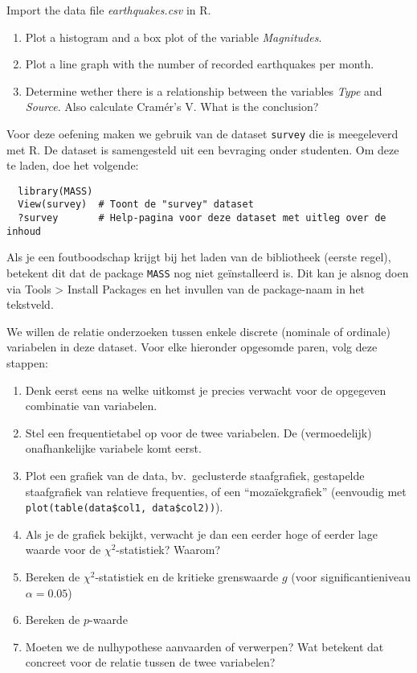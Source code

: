 \begin{exercise}
  \label{ex:earthquakes} %
  Import the data file \emph{earthquakes.csv} in R.

  \begin{enumerate}
    \item Plot a histogram and a box plot of the variable \emph{Magnitudes}.
    \item Plot a line graph with the number of recorded earthquakes per month.
    \item Determine wether there is a relationship between the variables \emph{Type} and \emph{Source}. Also calculate Cramér's V. What is the conclusion?
  \end{enumerate}
\end{exercise}

\begin{exercise}  %
  \label{ex:chisq-survey}
  Voor deze oefening maken we gebruik van de dataset \texttt{survey} die is meegeleverd met R. De dataset is samengesteld uit een bevraging onder studenten. Om deze te laden, doe het volgende:
  
  \begin{lstlisting}
  library(MASS)
  View(survey)  # Toont de "survey" dataset
  ?survey       # Help-pagina voor deze dataset met uitleg over de inhoud
  \end{lstlisting}
  
  Als je een foutboodschap krijgt bij het laden van de bibliotheek (eerste regel), betekent dit dat de package \texttt{MASS} nog niet geïnstalleerd is. Dit kan je alsnog doen via Tools > Install Packages en het invullen van de package-naam in het tekstveld.
  
  We willen de relatie onderzoeken tussen enkele discrete (nominale of ordinale) variabelen in deze dataset. Voor elke hieronder opgesomde paren, volg deze stappen:
  
  \begin{enumerate}[label=(\alph*)]
    \item Denk eerst eens na welke uitkomst je precies verwacht voor de opgegeven combinatie van variabelen.
    \item Stel een frequentietabel op voor de twee variabelen. De (vermoedelijk) onafhankelijke variabele komt eerst.
    \item Plot een grafiek van de data, bv.~geclusterde staafgrafiek, gestapelde staafgrafiek van relatieve frequenties, of een ``mozaïekgrafiek'' (eenvoudig met \texttt{plot(table(data\$col1, data\$col2))}).
    \item Als je de grafiek bekijkt, verwacht je dan een eerder hoge of eerder lage waarde voor de $\chi^2$-statistiek? Waarom?
    \item Bereken de $\chi^2$-statistiek en de kritieke grenswaarde $g$ (voor significantieniveau $\alpha = 0.05$)
    \item Bereken de $p$-waarde
    \item Moeten we de nulhypothese aanvaarden of verwerpen? Wat betekent dat concreet voor de relatie tussen de twee variabelen?
  \end{enumerate}
  

\end{exercise}
